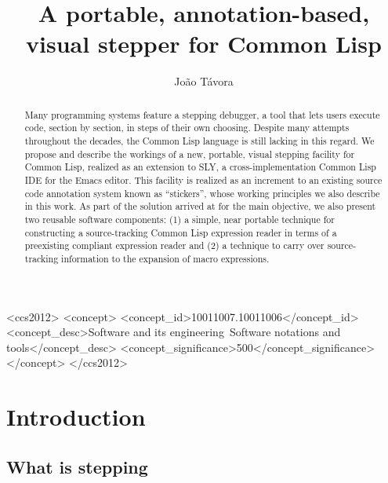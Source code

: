 \documentclass[sigconf]{acmart}
\author{João Távora} \affiliation{Ravenpack}
\begin{document}
\title{A portable, annotation-based, visual stepper for Common Lisp}

\begin{abstract}
  Many programming systems feature a stepping debugger, a tool that
  lets users execute code, section by section, in steps of their own
  choosing.  Despite many attempts throughout the decades, the Common
  Lisp language is still lacking in this regard.  We propose and
  describe the workings of a new, portable, visual stepping facility
  for Common Lisp, realized as an extension to SLY, a
  cross-implementation Common Lisp IDE for the Emacs editor.  This
  facility is realized as an increment to an existing source code
  annotation system known as ``stickers'', whose working principles we
  also describe in this work.  As part of the solution arrived at for
  the main objective, we also present two reusable software
  components: (1) a simple, near portable technique for constructing a
  source-tracking Common Lisp expression reader in terms of a
  preexisting compliant expression reader and (2) a technique to carry
  over source-tracking information to the expansion of macro
  expressions.
\end{abstract}


\begin{CCSXML}
<ccs2012>
   <concept>
       <concept_id>10011007.10011006</concept_id>
       <concept_desc>Software and its engineering~Software notations and tools</concept_desc>
       <concept_significance>500</concept_significance>
       </concept>
 </ccs2012>
\end{CCSXML}


\maketitle
\section{Introduction}
\subsection{What is stepping}
\end{document}
